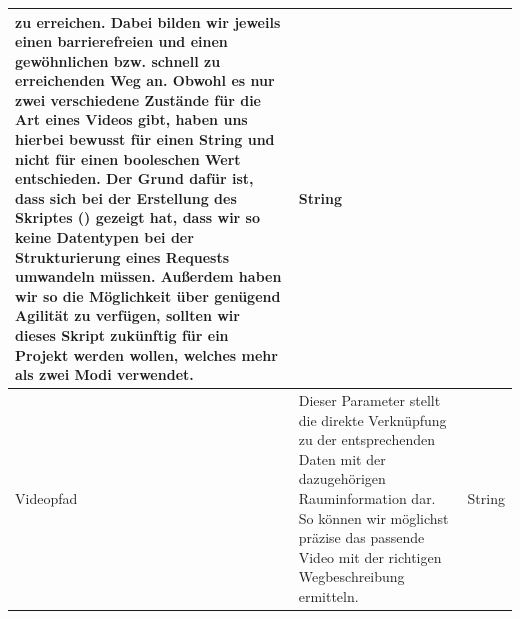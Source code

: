 \begin{tabular}{| l | p{9.45cm} | c| }
    zu erreichen. Dabei bilden wir jeweils einen barrierefreien und einen gewöhnlichen
    bzw. schnell zu erreichenden Weg an. Obwohl es nur zwei verschiedene Zustände für die Art eines Videos gibt, haben uns hierbei bewusst für einen String und nicht für einen booleschen Wert entschieden. Der Grund dafür ist, dass sich bei der Erstellung des Skriptes () gezeigt hat, dass wir so keine Datentypen bei der Strukturierung eines Requests umwandeln müssen. Außerdem haben wir so die Möglichkeit über genügend Agilität zu verfügen, sollten wir dieses Skript zukünftig für ein Projekt werden wollen, welches mehr als zwei Modi verwendet. & String                                                                                                                                                                                                                                                                                                        \\[0.5ex]
    \hline
    Videopfad                                                                                                                                                                                                                                                                                                                                                                                                                                                                                                                                                       & \small Dieser Parameter stellt die direkte Verknüpfung zu der entsprechenden Daten mit der dazugehörigen Rauminformation dar. So können wir möglichst präzise das passende Video mit der richtigen Wegbeschreibung ermitteln.
                                                                                                                                                                                                                                                                                                                                                                                                                                                                                                                                                                    & String                                                                                                                                                                                                                                                                                                        \\

\end{tabular}
